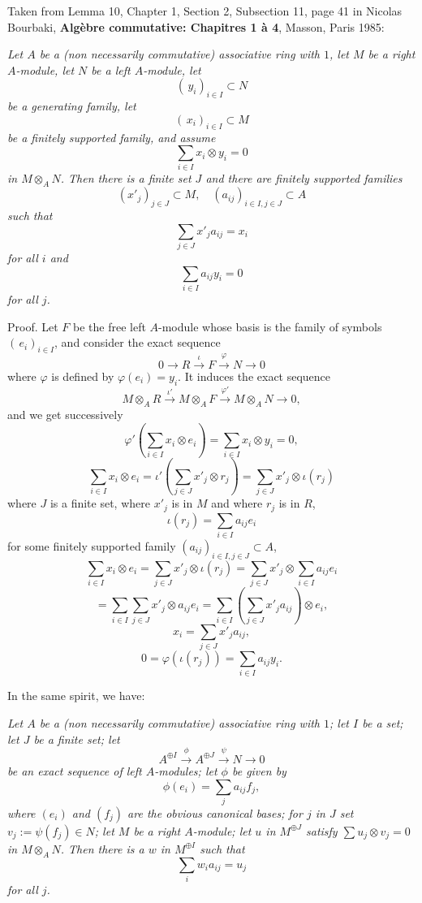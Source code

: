 \documentclass[12pt]{article}
\begin{document}
Taken from Lemma 10, Chapter 1, Section 2, Subsection 11, page 41 in Nicolas Bourbaki, \textbf{Algèbre commutative: Chapitres 1 à 4}, Masson, Paris 1985:

\emph{Let $A$ be a (non necessarily commutative) associative ring with $1$, let $M$ be a right $A$-module, let $N$ be a left $A$-module, let 
$$
(\,y_i)_{i\in I}\subset N
$$ 
be a generating family, let 
$$
(\,x_i)_{i\in I}\subset M
$$ 
be a finitely supported family, and assume 
$$
\sum_{i\in I}x_i\otimes y_i=0
$$ 
in $M\otimes_AN$. Then there is a finite set $J$ and there are finitely supported families 
$$
(x'_j)_{j\in J}\subset M,\quad(a_{ij})_{i\in I,j\in J}\subset A
$$ 
such that 
$$
\sum_{j\in J} x'_ja_{ij}=x_i
$$ 
for all $i$ and 
$$
\sum_{i\in I}a_{ij}y_i=0
$$ 
for all $j$.}

Proof. Let $F$ be the free left $A$-module whose basis is the family of symbols $(\,e_i)_{i\in I}$, and consider the exact sequence 
$$
0\to R\xrightarrow\iota F\xrightarrow\varphi N\to 0
$$ 
where $\varphi$ is defined by $\varphi(e_i)=y_i$. It induces the exact sequence 
$$
M\otimes_AR\xrightarrow{\iota'}M\otimes_AF\xrightarrow{\varphi'}M\otimes_AN\to 0,
$$ 
and we get successively
$$
\varphi'\left(\sum_{i\in I}x_i\otimes e_i\right)=\sum_{i\in I}x_i\otimes y_i=0,
$$ 
$$
\sum_{i\in I}x_i\otimes e_i=\iota'\left(\sum_{j\in J}x'_j\otimes r_j\right)=\sum_{j\in J}x'_j\otimes\iota(r_j)
$$ 
where $J$ is a finite set, where $x'_j$ is in $M$ and where $r_j$ is in $R$, 
$$
\iota(r_j)=\sum_{i\in I}a_{ij}e_i
$$ 
for some finitely supported family $(a_{ij})_{i\in I,j\in J}\subset A$, 
$$
\sum_{i\in I}x_i\otimes e_i=\sum_{j\in J}x'_j\otimes\iota(r_j)=\sum_{j\in J} x'_j\otimes\sum_{i\in I}a_{ij}e_i
$$
$$
=\sum_{i\in I}\sum_{j\in J} x'_j\otimes a_{ij}e_i=\sum_{i\in I}\left(\sum_{j\in J}x'_ja_{ij}\right)\otimes e_i,
$$ 
$$
x_i=\sum_{j\in J}x'_ja_{ij},
$$ 
$$
0=\varphi(\iota(r_j))=\sum_{i\in I}a_{ij}y_i.
$$ 

In the same spirit, we have:

\emph{Let $A$ be a (non necessarily commutative) associative ring with $1$; let $I$ be a set; let $J$ be a finite set; let 
$$
A^{\oplus I}\xrightarrow\phi A^{\oplus J}\xrightarrow\psi N\to0
$$ 
be an exact sequence of left $A$-modules; let $\phi$ be given by 
$$
\phi(e_i)=\sum_ja_{ij}f_j,
$$ 
where $(e_i)$ and $(f_j)$ are the obvious canonical bases; for $j$ in $J$ set $v_j:=\psi(f_j)\in N$; let $M$ be a right $A$-module; let $u$ in $M^{\oplus J}$ satisfy $\sum u_j\otimes v_j=0$ in $M\otimes_AN$. Then there is a $w$ in $M^{\oplus I}$ such that 
$$
\sum_iw_ia_{ij}=u_j
$$ 
for all $j$.}
\end{document}
